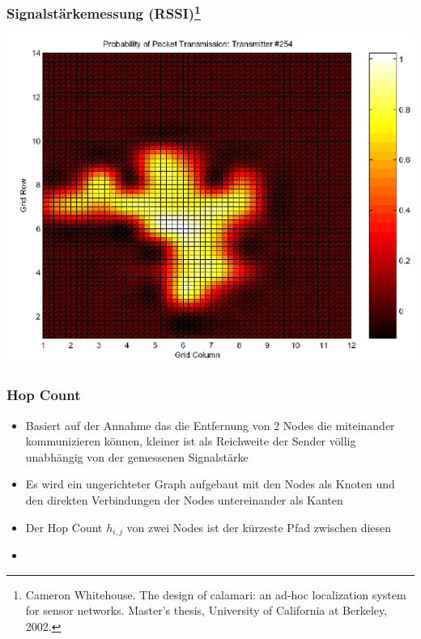 \begin{frame}
\frametitle{Signalstärkemessung (RSSI)\footnote{Cameron Whitehouse. The design of calamari: an ad-hoc localization
system for sensor networks. Master’s thesis, University of California at
Berkeley, 2002.}}
  \begin{center}
  \includegraphics[scale=0.5]{img/RSSI1}
  \end{center}
\end{frame}

\begin{frame}
\frametitle{Hop Count}

\begin{itemize}
  \item Basiert auf der Annahme das die Entfernung von 2 Nodes die
    miteinander kommunizieren können, kleiner ist als Reichweite der
    Sender völlig unabhängig von der gemessenen Signalstärke
  \item Es wird ein ungerichteter Graph aufgebaut mit den Nodes als
    Knoten und den direkten Verbindungen der Nodes untereinander als
    Kanten
  \item Der Hop Count $h_{i,j}$ von zwei Nodes ist der kürzeste Pfad
    zwischen diesen
  \item 
\end{itemize}
\end{frame}

